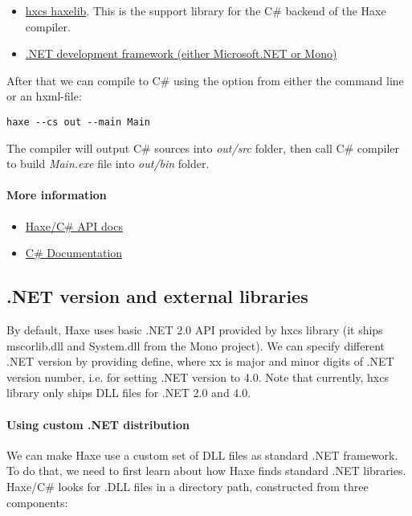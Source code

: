 \begin{itemize}
	\item \href{http://lib.haxe.org/p/hxcs}{hxcs haxelib}. This is the support library for the C\# backend of the Haxe compiler.
	\item \href{https://www.microsoft.com/net}{.NET development framework (either Microsoft.NET or Mono)}
\end{itemize}

After that we can compile to C\# using the  option from either the command line or an hxml-file:

\begin{lstlisting}
haxe --cs out --main Main
\end{lstlisting}

The compiler will output C\# sources into  \emph{out/src} folder, then call C\# compiler to build  \emph{Main.exe} file into  \emph{out/bin} folder.

\paragraph{More information}

\begin{itemize}
	\item \href{https://api.haxe.org/cs/}{Haxe/C\# API docs}
	\item \href{https://msdn.microsoft.com/en-us/library/kx37x362.aspx}{C\# Documentation}
\end{itemize}


\subsection{.NET version and external libraries}
\label{target-cs-external-libraries}

By default, Haxe uses basic .NET 2.0 API provided by hxcs library (it ships mscorlib.dll and System.dll from the Mono project). We can specify different .NET version by providing  define, where xx is major and minor digits of .NET version number, i.e.  for setting .NET version to 4.0. Note that currently, hxcs library only ships DLL files for .NET 2.0 and 4.0.

\paragraph{Using custom .NET distribution}

We can make Haxe use a custom set of DLL files as standard .NET framework. To do that, we need to first learn about how Haxe finds standard .NET libraries. Haxe/C\# looks for .DLL files in a directory path, constructed from three components:

